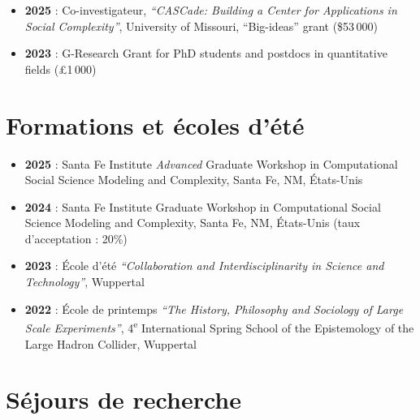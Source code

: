 \documentclass[11pt,a4paper]{article}
\begin{document}
\begin{itemize}
    \item \textbf{2025} : Co-investigateur, \textit{``CASCade: Building a Center for Applications in Social Complexity''}, University of Missouri, ``Big-ideas'' grant (\$53\,000)
    \item \textbf{2023} : G-Research Grant for PhD students and postdocs in quantitative fields (£1\,000)
\end{itemize}


\section{Formations et écoles d'été}

\begin{itemize}
    \item \textbf{2025} : Santa Fe Institute \textit{Advanced} Graduate Workshop in Computational Social Science Modeling and Complexity, Santa Fe, NM, États-Unis
    \item \textbf{2024} : Santa Fe Institute Graduate Workshop in Computational Social Science Modeling and Complexity, Santa Fe, NM, États-Unis (taux d'acceptation : 20\%)
    \item \textbf{2023} : École d'été \textit{``Collaboration and Interdisciplinarity in Science and Technology''}, Wuppertal
    \item \textbf{2022} : École de printemps \textit{``The History, Philosophy and Sociology of Large Scale Experiments''}, 4\textsuperscript{e} International Spring School of the Epistemology of the Large Hadron Collider, Wuppertal
\end{itemize}


\section{Séjours de recherche}
\end{document}
